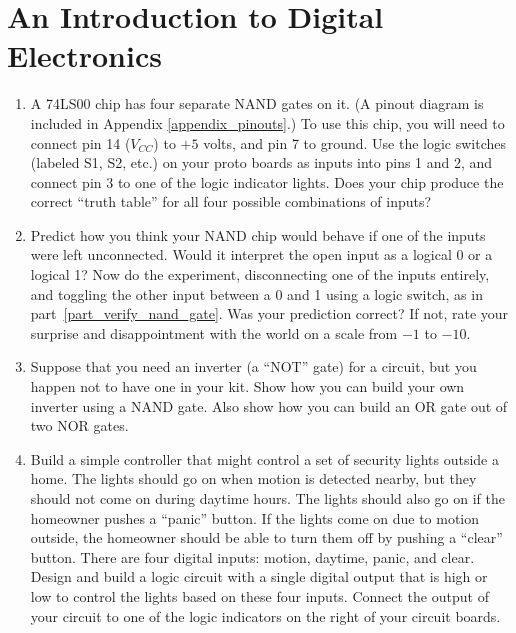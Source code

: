 \section{An Introduction to Digital Electronics}
\label{lab_digital_electronics}


\bigskip

\begin{enumerate}[wide]

\item A 74LS00 chip has four separate NAND gates on it.  (A pinout diagram is included in Appendix \ref{appendix_pinouts}.) To use this chip, you will need to connect pin 14 ($V_{CC}$) to $+5$ volts, and pin 7 to ground.  Use the logic switches (labeled S1, S2, etc.) on your proto boards as inputs into pins 1 and 2, and connect pin 3 to one of the logic indicator lights.  Does your chip produce the correct ``truth table'' for all four possible combinations of inputs?\label{part_verify_nand_gate}

\item Predict how you think your NAND chip would behave if one of the inputs were left unconnected.  Would it interpret the open input as a logical 0 or a logical 1?  Now do the experiment, disconnecting one of the inputs entirely, and toggling the other input between a 0 and 1 using a logic switch, as in part~\ref{part_verify_nand_gate}.  Was your prediction correct?  If not, rate your surprise and disappointment with the world on a scale from $-1$ to $-10$. \label{part_open_digital_inputs}

\item Suppose that you need an inverter (a ``NOT'' gate) for a circuit, but you happen not to have one in your kit.  Show how you can build your own inverter using a NAND gate.  Also show how you can build an OR gate out of two NOR gates.

\item Build a simple controller that might control a set of security lights outside a home.  The lights should go on when motion is detected nearby, but they should not come on during daytime hours.  The lights should also go on if the homeowner pushes a ``panic'' button.  If the lights come on due to motion outside, the homeowner should be able to turn them off by pushing a ``clear'' button.  There are four digital inputs: motion, daytime, panic, and clear.  Design and build a logic circuit with a single digital output that is high or low to control the lights based on these four inputs.  Connect the output of your circuit to one of the logic indicators on the right of your circuit boards.


\end{enumerate}
